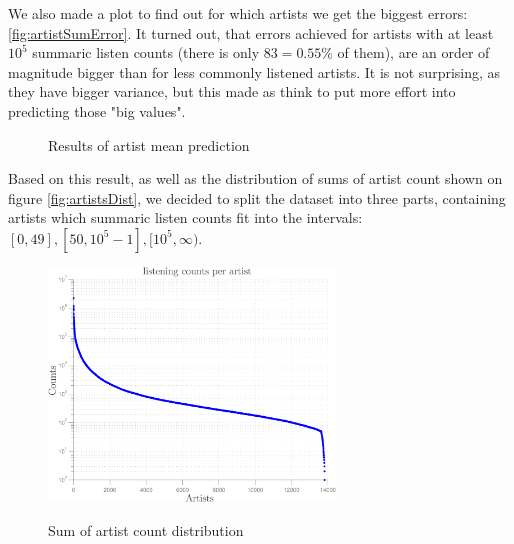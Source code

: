 \documentclass{article}
\begin{document}
 We also made a plot to find out for which artists we get the biggest errors: \ref{fig:artistSumError}. It turned out, that errors achieved for artists with at least $10^5$ summaric listen counts (there is only $83 = 0.55\%$ of them), are an order of magnitude bigger than for less commonly listened artists. It is not surprising, as they have bigger variance, but this made as think to put more effort into predicting those "big values". 
\begin{figure}[!t]
\center
{}
\hfill
{}
\caption{Results of artist mean prediction}
\end{figure}

Based on this result, as well as the distribution of sums of artist count shown on figure \ref{fig:artistsDist}, we decided to split the dataset into three parts, containing artists which summaric listen counts fit into the intervals:  $[0, 49], [50, 10^5-1], [10^5, \infty)$.
\begin{figure}[!t]
\center
\includegraphics[width=3in]{../figures/artists-distribution-crop.pdf} \label{fig:artistDist}
\caption{Sum of artist count distribution}
\end{figure}
\end{document}

